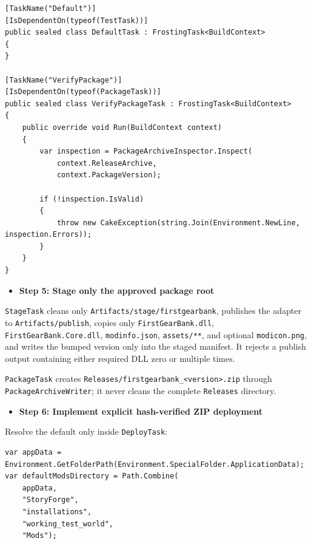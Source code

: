 \documentclass[
  10pt,
  letterpaper,
]{article}
\newcommand{\passthrough}[1]{#1}
\providecommand{\tightlist}{%
  \setlength{\itemsep}{0pt}\setlength{\parskip}{0pt}}
\begin{document}
\begin{lstlisting}
[TaskName("Default")]
[IsDependentOn(typeof(TestTask))]
public sealed class DefaultTask : FrostingTask<BuildContext>
{
}

[TaskName("VerifyPackage")]
[IsDependentOn(typeof(PackageTask))]
public sealed class VerifyPackageTask : FrostingTask<BuildContext>
{
    public override void Run(BuildContext context)
    {
        var inspection = PackageArchiveInspector.Inspect(
            context.ReleaseArchive,
            context.PackageVersion);

        if (!inspection.IsValid)
        {
            throw new CakeException(string.Join(Environment.NewLine, inspection.Errors));
        }
    }
}
\end{lstlisting}

\begin{itemize}
\tightlist
\item[$\square$]
  \textbf{Step 5: Stage only the approved package root}
\end{itemize}

\passthrough{\lstinline!StageTask!} cleans only
\texttt{Artifacts/}\allowbreak{}\texttt{stage/}\allowbreak{}\texttt{firstgearbank},
publishes the adapter to
\texttt{Artifacts/}\allowbreak{}\texttt{publish}, copies only
\passthrough{\lstinline!FirstGearBank.dll!},
\passthrough{\lstinline!FirstGearBank.Core.dll!},
\passthrough{\lstinline!modinfo.json!},
\texttt{assets/}\allowbreak{}\texttt{**}, and optional
\passthrough{\lstinline!modicon.png!}, and writes the bumped version
only into the staged manifest. It rejects a publish output containing
either required DLL zero or multiple times.

\passthrough{\lstinline!PackageTask!} creates
\texttt{Releases/}\allowbreak{}\texttt{firstgearbank\_}\allowbreak{}\texttt{\textless{}}\allowbreak{}\texttt{version\textgreater{}}\allowbreak{}\texttt{.}\allowbreak{}\texttt{zip}
through \passthrough{\lstinline!PackageArchiveWriter!}; it never cleans
the complete \passthrough{\lstinline!Releases!} directory.

\begin{itemize}
\tightlist
\item[$\square$]
  \textbf{Step 6: Implement explicit hash-verified ZIP deployment}
\end{itemize}

Resolve the default only inside \passthrough{\lstinline!DeployTask!}:

\begin{lstlisting}
var appData = Environment.GetFolderPath(Environment.SpecialFolder.ApplicationData);
var defaultModsDirectory = Path.Combine(
    appData,
    "StoryForge",
    "installations",
    "working_test_world",
    "Mods");
\end{lstlisting}
\end{document}
